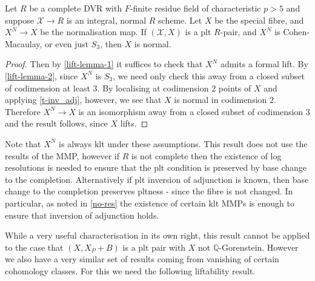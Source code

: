 \begin{lemma}\label{adj1}
	
	Let $R$ be a complete DVR with $F$-finite residue field of characteristic $p> 5$ and suppose $\mathcal{X} \to R$ is an integral, normal $R$ scheme. Let $X$ be the special fibre, and $X^{N} \to X$ be the normalisation map. If $(\mathcal{X},X)$ is a plt $R$-pair, and $X^{N}$ is Cohen-Macaulay, or even just $S_{3}$, then $X$ is normal.
	
	\end{lemma}

\begin{proof}

	Then by \autoref{lift-lemma-1} it suffices to check that $X^{N}$ admits a formal lift. By \autoref{lift-lemma-2}, since $X^{N}$ is $S_{3}$, we need only check this away from a closed subset of codimension at least $3$. By localising at codimension $2$ points of $X$ and applying \autoref{t-inv_adj}, however, we see that $X$ is normal in codimension $2$. Therefore $X^{N} \to X$ is an isomorphism away from a closed subset of codimension $3$ and the result follows, since $X$ lifts.
	
\end{proof}

Note that $X^{N}$ is always klt under these assumptions. This result does not use the results of the MMP, however if $R$ is not complete then the existence of log resolutions is needed to ensure that the plt condition is preserved by base change to the completion. Alternatively if plt inversion of adjunction is known, then base change to the completion preserves pltness - since the fibre is not changed. In particular, as noted in \autoref{no-res} the existence of certain klt MMPs is enough to ensure that inversion of adjunction holds.
 
While a very useful characterisation in its own right, this result cannot be applied to the case that $(X,X_{P}+B)$ is a plt pair with $X$ not $\mathbb{Q}$-Gorenstein. However we also have a very similar set of results coming from vanishing of certain cohomology classes. For this we need the following liftability result.

